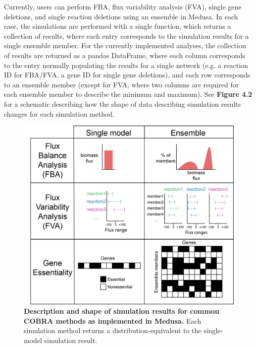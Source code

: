 \documentclass[11pt,twocolumn,notitlepage,openany,twoside]{book}
\begin{document}
\begin{refsection}
Currently, users can perform FBA, flux variability analysis (FVA), single gene deletions, and single reaction deletions using an ensemble in Medusa. In each case, the simulations are performed with a single function, which returns a collection of results, where each entry corresponds to the simulation results for a single ensemble member. For the currently implemented analyses, the collection of results are returned as a pandas DataFrame, where each column corresponds to the entry normally populating the results for a single network (e.g. a reaction ID for FBA/FVA, a gene ID for single gene deletions), and each row corresponds to an ensemble member (except for FVA, where two columns are required for each ensemble member to describe the minimum and maximum). See \textbf{Figure 4.2} for a schematic describing how the shape of data describing simulation results changes for each simulation method.

\begin{figure}[tb]
\centering
\includegraphics[width=\linewidth]{ch4_fig2}
\caption[ Description and shape of simulation results for common COBRA methods as implemented in Medusa.]{\textbf{ Description and shape of simulation results for common COBRA methods as implemented in Medusa.} Each simulation method returns a distribution-equivalent to the single-model simulation result.}
\end{figure}


\end{refsection}
\end{document}
